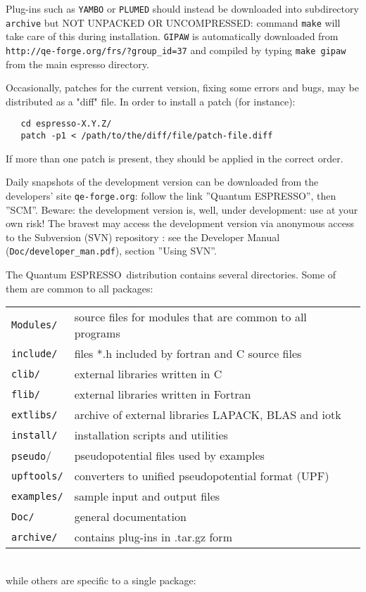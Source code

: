 \documentclass[12pt,a4paper]{article}
\def\qe{{\sc Quantum ESPRESSO}}
\begin{document}
Plug-ins such as \texttt{YAMBO} or \texttt{PLUMED} should instead be downloaded into
subdirectory \texttt{archive} but \uppercase{not unpacked or uncompressed}:
command \texttt{make} will take care of this during installation. \texttt{GIPAW}
is automatically downloaded from \texttt{http://qe-forge.org/frs/?group\_id=37}
and compiled by typing \texttt{make gipaw} from the main espresso directory.

Occasionally, patches for the current version, fixing some errors and bugs,
may be distributed as a "diff" file. In order to install a patch (for 
instance):
\begin{verbatim}
   cd espresso-X.Y.Z/
   patch -p1 < /path/to/the/diff/file/patch-file.diff
\end{verbatim}
If more than one patch is present, they should be applied in the correct order.

Daily snapshots of the development version can be downloaded from the
developers' site \texttt{qe-forge.org}: follow the link ''Quantum ESPRESSO'', 
then ''SCM''. Beware: the development version 
is, well, under development: use at your own risk! The bravest 
may access the development version via anonymous access to the
Subversion (SVN) repository : see the Developer Manual
(\texttt{Doc/developer\_man.pdf}), section ''Using SVN''.

The \qe\ distribution contains several directories. Some of them are
common to all packages:

\begin{tabular}{ll}
\texttt{Modules/} &  source files for modules that are common to all programs\\
\texttt{include/} &  files *.h included by fortran and C source files\\
\texttt{clib/}    &  external libraries written in C\\
\texttt{flib/}    &  external libraries written in Fortran\\
\texttt{extlibs/ }&  archive of external libraries LAPACK, BLAS and iotk\\
\texttt{install/} &  installation scripts and utilities\\
\texttt{pseudo}/  &  pseudopotential files used by examples\\
\texttt{upftools/}&  converters to unified pseudopotential format (UPF)\\
\texttt{examples/}&  sample input and output files\\
\texttt{Doc/}     &  general documentation\\
\texttt{archive/} &  contains plug-ins in .tar.gz form\\
\end{tabular}
\\
while others are specific to a single package:
\end{document}
